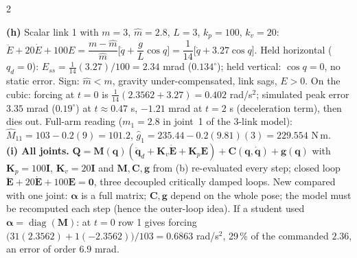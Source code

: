 \begin{multicols}{2}
\begin{examq}
\end{examq}
\begin{examq}
\textbf{(h)} Scalar link 1 with $m=3$, $\hat m=2.8$, $L=3$, $k_p=100$, $k_v=20$: $\ddot E+20\dot E+100E=\dfrac{m-\hat m}{\hat m}\Big[\ddot q+\dfrac gL\cos q\Big]=\dfrac1{14}\big[\ddot q+3.27\cos q\big]$. Held horizontal ($q_d=0$): $E_{ss}=\tfrac1{14}(3.27)/100=2.34$ mrad ($0.134^\circ$); held vertical: $\cos q=0$, no static error. Sign: $\hat m<m$, gravity under-compensated, link sags, $E>0$. On the cubic: forcing at $t=0$ is $\tfrac1{14}(2.3562+3.27)=0.402$ rad/s$^2$; simulated peak error $3.35$ mrad ($0.19^\circ$) at $t\approx0.47$ s, $-1.21$ mrad at $t=2$ s (deceleration term), then dies out. Full-arm reading ($m_1=2.8$ in joint~1 of the 3-link model): $\hat M_{11}=103-0.2(9)=101.2$, $\hat g_1=235.44-0.2(9.81)(3)=229.554$ N\,m. \chk\\
\textbf{(i) All joints.} $\mathbf Q=\mathbf M(\mathbf q)(\ddot{\mathbf q}_d+\mathbf K_v\dot{\mathbf E}+\mathbf K_p\mathbf E)+\mathbf C(\mathbf q,\dot{\mathbf q})+\mathbf g(\mathbf q)$ with $\mathbf K_p=100\mathbf I$, $\mathbf K_v=20\mathbf I$ and $\mathbf M,\mathbf C,\mathbf g$ from (b) re-evaluated every step; closed loop $\ddot{\mathbf E}+20\dot{\mathbf E}+100\mathbf E=\mathbf 0$, three decoupled critically damped loops. New compared with one joint: $\boldsymbol\alpha$ is a full matrix; $\mathbf C,\mathbf g$ depend on the whole pose; the model must be recomputed each step (hence the outer-loop idea). If a student used $\boldsymbol\alpha=\operatorname{diag}(\mathbf M)$: at $t=0$ row 1 gives forcing $\big(31(2.3562)+1(-2.3562)\big)/103=0.6863$ rad/s$^2$, 29\,\% of the commanded $2.36$, an error of order $6.9$ mrad. \chk
\end{examq}


\end{multicols}
